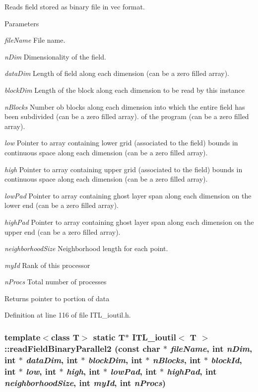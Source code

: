 Reads field stored as binary file in vec format. 
\begin{DoxyParams}{Parameters}
\item[{\em fileName}]File name. \item[{\em nDim}]Dimensionality of the field. \item[{\em dataDim}]Length of field along each dimension (can be a zero filled array). \item[{\em blockDim}]Length of the block along each dimension to be read by this instance \item[{\em nBlocks}]Number ob blocks along each dimension into which the entire field has been subdivided (can be a zero filled array). of the program (can be a zero filled array). \item[{\em low}]Pointer to array containing lower grid (associated to the field) bounds in continuous space along each dimension (can be a zero filled array). \item[{\em high}]Pointer to array containing upper grid (associated to the field) bounds in continuous space along each dimension (can be a zero filled array). \item[{\em lowPad}]Pointer to array containing ghost layer span along each dimension on the lower end (can be a zero filled array). \item[{\em highPad}]Pointer to array containing ghost layer span along each dimension on the upper end (can be a zero filled array). \item[{\em neighborhoodSize}]Neighborhood length for each point. \item[{\em myId}]Rank of this processor \item[{\em nProcs}]Total number of processes \end{DoxyParams}
\begin{DoxyReturn}{Returns}
pointer to portion of data 
\end{DoxyReturn}


Definition at line 116 of file ITL\_\-ioutil.h.

\hypertarget{classITL__ioutil_a30703d23067b4ded11a11533d204d185}{
\subsubsection[{readFieldBinaryParallel2}]{\setlength{\rightskip}{0pt plus 5cm}template$<$class T$>$ static T$\ast$ {\bf ITL\_\-ioutil}$<$ T $>$::readFieldBinaryParallel2 (const char $\ast$ {\em fileName}, \/  int {\em nDim}, \/  int $\ast$ {\em dataDim}, \/  int $\ast$ {\em blockDim}, \/  int $\ast$ {\em nBlocks}, \/  int $\ast$ {\em blockId}, \/  int $\ast$ {\em low}, \/  int $\ast$ {\em high}, \/  int $\ast$ {\em lowPad}, \/  int $\ast$ {\em highPad}, \/  int {\em neighborhoodSize}, \/  int {\em myId}, \/  int {\em nProcs})}}
\label{classITL__ioutil_a30703d23067b4ded11a11533d204d185}


